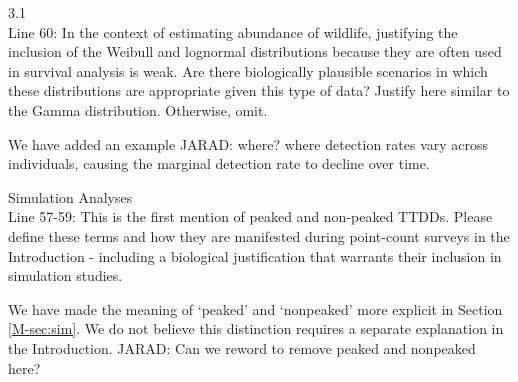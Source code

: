\documentclass[12pt]{article}
\renewenvironment{quote}  %
              {\list{}{\rightmargin\leftmargin}\normalfont%
               \item\relax}
              {\endlist}
\newcommand{\jarad}[1]{{\color{Orange} JARAD: #1}}
\begin{document}
3.1 \\
Line 60: In the context of estimating abundance of wildlife, justifying the inclusion of the Weibull and lognormal distributions because they are often used in survival analysis is weak.  Are there biologically plausible scenarios in which these distributions are appropriate given this type of data?  Justify here similar to the Gamma distribution.  Otherwise, omit.
\begin{quote}
We have added an example \jarad{where?} where detection rates vary across individuals, causing the marginal detection rate to decline over time.
\end{quote}

Simulation Analyses\\
Line 57-59: This is the first mention of peaked and non-peaked TTDDs.  Please define these terms and how they are manifested during point-count surveys in the Introduction - including a biological justification that warrants their inclusion in simulation studies.
\begin{quote}
We have made the meaning of `peaked' and `nonpeaked' more explicit in Section \ref{M-sec:sim}.
We do not believe this distinction requires a separate explanation in the Introduction.
\jarad{Can we reword to remove peaked and nonpeaked here?}
\end{quote}
\end{document}
